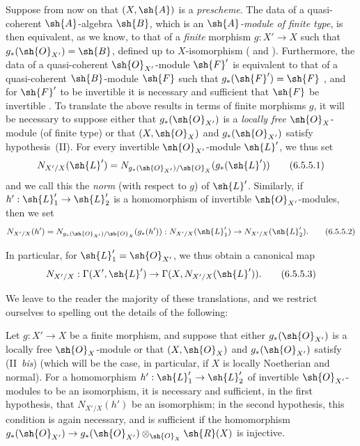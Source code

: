 \begin{env}[6.5.5]
\label{II.6.5.5}
Suppose from now on that $(X,\sh{A})$ is a \emph{prescheme}.
The data of a quasi-coherent $\sh{A}$-algebra $\sh{B}$, which is an \emph{$\sh{A}$-module of finite type}, is then equivalent, as we know, to that of a \emph{finite} morphism $g:X'\to X$ such that $g_*(\sh{O}_{X'})=\sh{B}$, defined up to $X$-isomorphism ( and ).
Furthermore, the data of a quasi-coherent $\sh{O}_{X'}$-module $\sh{F}'$ is equivalent to that of a quasi-coherent $\sh{B}$-module $\sh{F}$ such that $g_*(\sh{F}')=\sh{F}$ , and for $\sh{F}'$ to be invertible it is necessary and sufficient that $\sh{F}$ be invertible .
To translate the above results in terms of finite morphisms $g$, it will be necessary to suppose either that $g_*(\sh{O}_{X'})$ is a \emph{locally free} $\sh{O}_X$-module (of finite type) or that $(X,\sh{O}_X)$ and $g_*(\sh{O}_{X'})$ satisfy hypothesis~(II).
For every invertible $\sh{O}_{X'}$-module $\sh{L}'$, we thus set
\[
\label{II.6.5.5.1}
  N_{X'/X}(\sh{L}') = N_{g_*(\sh{O}_{X'})/\sh{O}_X}(g_*(\sh{L}'))
\tag{6.5.5.1}
\]
and we call this the \emph{norm} (with respect to $g$) of $\sh{L}'$.
Similarly, if $h':\sh{L}'_1\to\sh{L}'_2$ is a homomorphism of invertible $\sh{O}_{X'}$-modules, then we set
\[
\label{II.6.5.5.2}
  N_{X'/X}(h') = N_{g_*(\sh{O}_{X'})/\sh{O}_X}(g_*(h')) : N_{X'/X}(\sh{L}'_1)\to N_{X'/X}(\sh{L}'_2).
\tag{6.5.5.2}
\]

In particular, for $\sh{L}'_1=\sh{O}_{X'}$, we thus obtain a canonical map
\[
\label{II.6.5.5.3}
  N_{X'/X} : \Gamma(X',\sh{L}') \to \Gamma(X,N_{X'/X}(\sh{L}')).
\tag{6.5.5.3}
\]

We leave to the reader the majority of these translations, and we restrict ourselves to spelling out the details of the following:
\end{env}

\begin{proposition}[6.5.6]
\label{II.6.5.6}
Let $g:X'\to X$ be a finite morphism, and suppose that either $g_*(\sh{O}_{X'})$ is a locally free $\sh{O}_X$-module or that $(X,\sh{O}_X)$ and $g_*(\sh{O}_{X'})$ satisfy (II~\emph{bis}) (which will be the case, in particular, if $X$ is locally Noetherian and normal).
For a homomorphism $h':\sh{L}'_1\to\sh{L}'_2$ of invertible $\sh{O}_{X'}$-modules to be an isomorphism, it is necessary and sufficient, in the first hypothesis, that $N_{X'/X}(h')$ be an isomorphism;
in the second hypothesis, this condition is again necessary, and is sufficient if the homomorphism $g_*(\sh{O}_{X'})\to g_*(\sh{O}_{X'})\otimes_{\sh{O}_X}\sh{R}(X)$ is injective.
\end{proposition}

